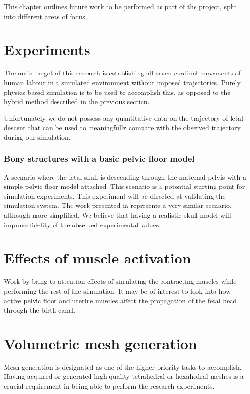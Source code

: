 This chapter outlines future work to be performed as part of the project, split into different areas of focus.

\section{Experiments}

The main target of this research is establishing all seven cardinal movements of human labour in a simulated environment without imposed trajectories. Purely physics based simulation is to be used to accomplish this, as opposed to the hybrid method described in the previous section.

Unfortunately we do not possess any quantitative data on the trajectory of fetal descent that can be used to meaningfully compare with the observed trajectory during our simulation.

\subsubsection{Bony structures with a basic pelvic floor model}
A scenario where the fetal skull is descending through the maternal pelvis with a simple pelvic floor model attached. This scenario is a potential starting point for simulation experiments. This experiment will be directed at validating the simulation system. The work presented in \cite{Parente2009} represents a very similar scenario, although more simplified. We believe that having a realistic skull model will improve fidelity of the observed experimental values.

\section{Effects of muscle activation}

Work by \citet{Martins2007} bring to attention effects of simulating the contracting muscles while performing the rest of the simulation. It may be of interest to look into how active pelvic floor and uterine muscles affect the propagation of the fetal head through the birth canal.

\section{Volumetric mesh generation}\label{future-meshgen}

Mesh generation is designated as one of the higher priority tasks to accomplish. Having acquired or generated high quality tetrahedral or hexahedral meshes is a crucial requirement in being able to perform the research experiments.

